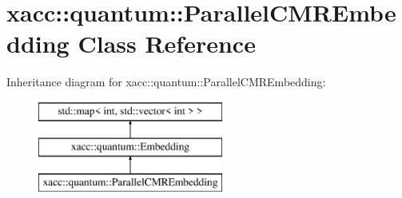 \hypertarget{a00093}{}\section{xacc\+:\+:quantum\+:\+:Parallel\+C\+M\+R\+Embedding Class Reference}
\label{a00093}
Inheritance diagram for xacc\+:\+:quantum\+:\+:Parallel\+C\+M\+R\+Embedding\+:\begin{figure}[H]
\begin{center}
\leavevmode
\includegraphics[height=3.000000cm]{a00093}
\end{center}
\end{figure}
